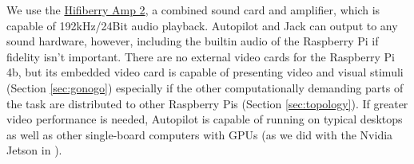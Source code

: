 We use the \href{https://www.hifiberry.com/shop/boards/hifiberry-amp2/}{Hifiberry Amp 2}, a combined sound card and amplifier, which is capable of 192kHz/24Bit audio playback. Autopilot and Jack can output to any sound hardware, however, including the builtin audio of the Raspberry Pi if fidelity isn't important. There are no external video cards for the Raspberry Pi 4b, but its embedded video card is capable of presenting video and visual stimuli (Section \ref{sec:gonogo}) especially if the other computationally demanding parts of the task are distributed to other Raspberry Pis (Section \ref{sec:topology}). If greater video performance is needed, Autopilot is capable of running on typical desktops as well as other single-board computers with GPUs (as we did with the Nvidia Jetson in \citep{kaneRealtimeLowlatencyClosedloop2020a}).

